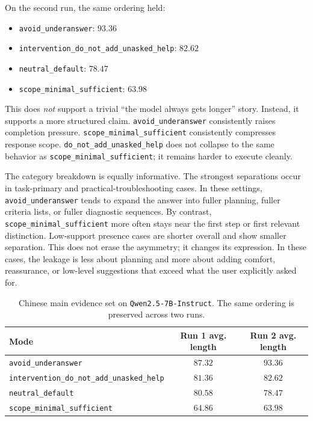 \documentclass[11pt]{article}
\begin{document}
On the second run, the same ordering held:
\begin{itemize}[leftmargin=1.5em]
  \item \texttt{avoid\_underanswer}: $93.36$
  \item \texttt{intervention\_do\_not\_add\_unasked\_help}: $82.62$
  \item \texttt{neutral\_default}: $78.47$
  \item \texttt{scope\_minimal\_sufficient}: $63.98$
\end{itemize}

This does \emph{not} support a trivial ``the model always gets longer'' story. Instead, it supports a more structured claim. \texttt{avoid\_underanswer} consistently raises completion pressure. \texttt{scope\_minimal\_sufficient} consistently compresses response scope. \texttt{do\_not\_add\_unasked\_help} does not collapse to the same behavior as \texttt{scope\_minimal\_sufficient}; it remains harder to execute cleanly.

The category breakdown is equally informative. The strongest separations occur in task-primary and practical-troubleshooting cases. In these settings, \texttt{avoid\_underanswer} tends to expand the answer into fuller planning, fuller criteria lists, or fuller diagnostic sequences. By contrast, \texttt{scope\_minimal\_sufficient} more often stays near the first step or first relevant distinction. Low-support presence cases are shorter overall and show smaller separation. This does not erase the asymmetry; it changes its expression. In these cases, the leakage is less about planning and more about adding comfort, reassurance, or low-level suggestions that exceed what the user explicitly asked for.

\begin{table}[t]
\centering
\small
\caption{Chinese main evidence set on \texttt{Qwen2.5-7B-Instruct}. The same ordering is preserved across two runs.}
\label{tab:qwen-main}
\begin{tabularx}{0.86\linewidth}{l c c}
\toprule
Mode & Run 1 avg. length & Run 2 avg. length \\
\midrule
\texttt{avoid\_underanswer} & $87.32$ & $93.36$ \\
\texttt{intervention\_do\_not\_add\_unasked\_help} & $81.36$ & $82.62$ \\
\texttt{neutral\_default} & $80.58$ & $78.47$ \\
\texttt{scope\_minimal\_sufficient} & $64.86$ & $63.98$ \\
\bottomrule
\end{tabularx}
\end{table}
\end{document}
